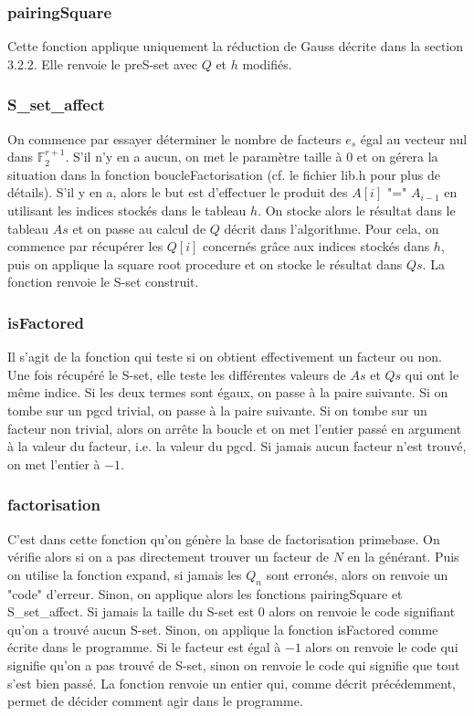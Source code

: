 \documentclass[a4paper]{article} %
\numberwithin{equation}{section}
\begin{document}
\subsubsection{pairingSquare}
Cette fonction applique uniquement la réduction de Gauss décrite dans la section 3.2.2. Elle renvoie le preS-set avec $Q$ et $h$ modifiés.
\subsubsection{S\_set\_affect}
On commence par essayer déterminer le nombre de facteurs $e_s$ égal au vecteur nul dans $\mathbb{F}_2^{r+1}$. S'il n'y en a aucun, on met le paramètre taille à $0$ et on gérera la situation dans la fonction boucleFactorisation (cf. le fichier lib.h pour plus de détails). S'il y en a, alors le but est d'effectuer le produit des $A[i]$ "=" $A_{i-1}$ en utilisant les indices stockés dans le tableau $h$. On stocke alors le résultat dans le tableau $As$ et on passe au calcul de $Q$ décrit dans l'algorithme. Pour cela, on commence par récupérer les $Q[i]$ concernés grâce aux indices stockés dans $h$, puis on applique la square root procedure et on stocke le résultat dans $Qs$. La fonction renvoie le S-set construit.
\subsubsection{isFactored}
Il s'agit de la fonction qui teste si on obtient effectivement un facteur ou non. Une fois récupéré le S-set, elle teste les différentes valeurs de $As$ et $Qs$ qui ont le même indice. Si les deux termes sont égaux, on passe à la paire suivante. Si on tombe sur un pgcd trivial, on passe à la paire suivante. Si on tombe sur un facteur non trivial, alors on arrête la boucle et on met l'entier passé en argument à la valeur du facteur, i.e. la valeur du pgcd. Si jamais aucun facteur n'est trouvé, on met l'entier à $-1$.
\subsubsection{factorisation}
C'est dans cette fonction qu'on génère la base de factorisation primebase. On vérifie alors si on a pas directement trouver un facteur de $N$ en la générant. Puis on utilise la fonction expand, si jamais les $Q_n$ sont erronés, alors on renvoie un "code" d'erreur. Sinon, on applique alors les fonctions pairingSquare et S\_set\_affect. Si jamais la taille du S-set est $0$ alors on renvoie le code signifiant qu'on a trouvé aucun S-set. Sinon, on applique la fonction isFactored comme écrite dans le programme. Si le facteur est égal à $-1$ alors on renvoie le code qui signifie qu'on a pas trouvé de S-set, sinon on renvoie le code qui signifie que tout s'est bien passé. La fonction renvoie un entier qui, comme décrit précédemment, permet de décider comment agir dans le programme.
\end{document}
